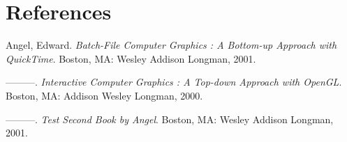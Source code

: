 \documentclass{article}
\newenvironment{CSLReferences}[2]
  {}
  {\par}
\begin{document}
\hypertarget{references}{%
\section*{References}\label{references}}


\noindent

\hypertarget{refs}{}
\begin{CSLReferences}{1}{0}
\leavevmode\hypertarget{ref-angel2001}{}%
Angel, Edward. \emph{Batch-File Computer Graphics : A Bottom-up Approach
with QuickTime}. Boston, MA: Wesley Addison Longman, 2001.

\leavevmode\hypertarget{ref-angel2000}{}%
---------. \emph{Interactive Computer Graphics : A Top-down Approach
with OpenGL}. Boston, MA: Addison Wesley Longman, 2000.

\leavevmode\hypertarget{ref-angel2002a}{}%
---------. \emph{Test Second Book by Angel}. Boston, MA: Wesley Addison
Longman, 2001.

\end{CSLReferences}

\end{document}
